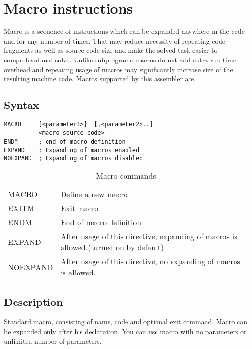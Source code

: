 \section{Macro instructions}
    Macro is a sequence of instructions which can be expanded anywhere in the code and for any number of times. That may reduce necessity of repeating code fragments as well as source code size and make the solved task easier to comprehend and solve. Unlike subprograms macros do not add extra run-time overhead and repeating usage of macros may significantly increase size of the resulting machine code. Macros supported by this assembler are.

    \subsection{Syntax}
        \verb'MACRO     [<parameter1>]  [,<parameter2>..]'\\
        \verb'          <macro source code>'\\
        \verb'ENDM      ; end of macro definition'
        \verb''~\\
        \verb'EXPAND    ; Expanding of macros enabled'\\
        \verb'NOEXPAND  ; Expanding of macros disabled'

        \begin{table}[h!]
            \begin{tabular}{|ll|}
                \hline
                MACRO      & Define a new macro \\
                EXITM      & Exit macro  \\
                ENDM       & End of macro definition \\
                EXPAND     & After usage of this directive, expanding of macros is allowed.(turned on by default)\\
                NOEXPAND   & After usage of this directive, no expanding of macros is allowed.\\
                \hline
            \end{tabular}
            \caption{Macro commands}
        \end{table}

    \subsection{Description}
        Standard macro, consisting of name, code and optional exit command. Macro can be expanded only after his declaration. You can use macro with no parameters  or unlimited number of parameters.

